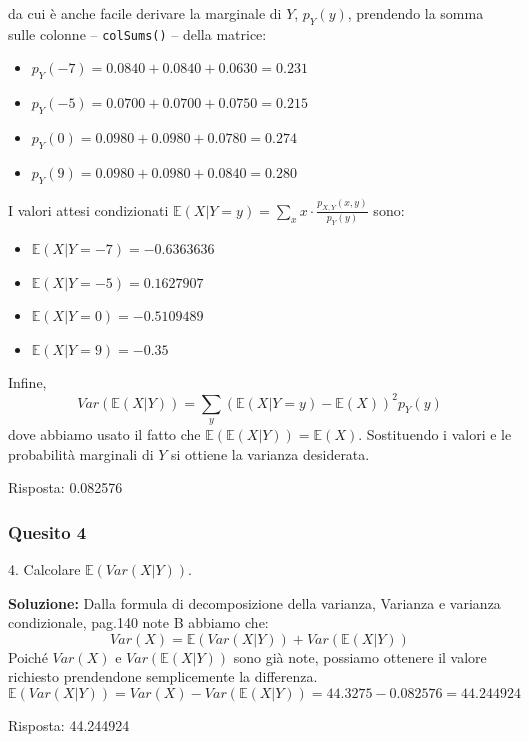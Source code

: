 \documentclass[12pt, a4paper]{article}
\begin{document}
da cui è anche facile derivare la marginale di $Y$, $p_Y(y)$, prendendo la somma sulle colonne – \texttt{colSums()} – della matrice:
\begin{itemize}
    \item $p_Y(-7) = 0.0840 + 0.0840 + 0.0630 = 0.231$
    \item $p_Y(-5) = 0.0700 + 0.0700 + 0.0750 = 0.215$
    \item $p_Y(0) = 0.0980 + 0.0980 + 0.0780 = 0.274$
    \item $p_Y(9) = 0.0980 + 0.0980 + 0.0840 = 0.280$
\end{itemize}

I valori attesi condizionati $\mathbb{E}(X|Y=y) = \sum_x x \cdot \frac{p_{X,Y}(x,y)}{p_Y(y)}$ sono:
\begin{itemize}
    \item $\mathbb{E}(X|Y=-7) = -0.6363636$
    \item $\mathbb{E}(X|Y=-5) = 0.1627907$
    \item $\mathbb{E}(X|Y=0) = -0.5109489$
    \item $\mathbb{E}(X|Y=9) = -0.35$
\end{itemize}

Infine, 
$$ Var(\mathbb{E}(X|Y)) = \sum_y (\mathbb{E}(X|Y=y) - \mathbb{E}(X))^2 p_Y(y) $$
dove abbiamo usato il fatto che $\mathbb{E}(\mathbb{E}(X|Y)) = \mathbb{E}(X)$. Sostituendo i valori e le probabilità marginali di $Y$ si ottiene la varianza desiderata.

Risposta: 0.082576

\subsubsection*{Quesito 4}
4. Calcolare $\mathbb{E}(Var(X|Y))$.

\textbf{Soluzione:}
Dalla formula di decomposizione della varianza, Varianza e varianza condizionale, pag.140 note B abbiamo che:
$$ Var(X) = \mathbb{E}(Var(X|Y)) + Var(\mathbb{E}(X|Y)) $$
Poiché $Var(X)$ e $Var(\mathbb{E}(X|Y))$ sono già note, possiamo ottenere il valore richiesto prendendone semplicemente la differenza.
$$ \mathbb{E}(Var(X|Y)) = Var(X) - Var(\mathbb{E}(X|Y)) = 44.3275 - 0.082576 = 44.244924 $$

Risposta: 44.244924
\end{document}
